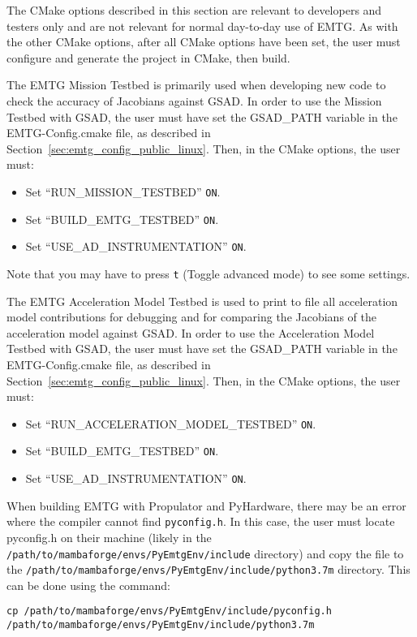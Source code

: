 
The CMake options described in this section are relevant to developers and testers only and are not relevant for normal day-to-day use of \ac{EMTG}. As with the other CMake options, after all CMake options have been set, the user must configure and generate the project in CMake, then build.

\noindent The \ac{EMTG} Mission Testbed is primarily used when developing new code to check the accuracy of Jacobians against \ac{GSAD}. In order to use the Mission Testbed with \ac{GSAD}, the user must have set the GSAD\_PATH variable in the EMTG-Config.cmake file, as described in Section~\ref{sec:emtg_config_public_linux}. Then, in the CMake options, the user must:

\begin{itemize}
	\item Set ``RUN\_MISSION\_TESTBED'' \texttt{ON}.
	\item Set ``BUILD\_EMTG\_TESTBED'' \texttt{ON}.
	\item Set ``USE\_AD\_INSTRUMENTATION'' \texttt{ON}.
\end{itemize}

\noindent Note that you may have to press \texttt{t} (Toggle advanced mode) to see some settings.

\noindent The \ac{EMTG} Acceleration Model Testbed is used to print to file all acceleration model contributions for debugging and for comparing the Jacobians of the acceleration model against \ac{GSAD}. In order to use the Acceleration Model Testbed with \ac{GSAD}, the user must have set the GSAD\_PATH variable in the EMTG-Config.cmake file, as described in Section~\ref{sec:emtg_config_public_linux}. Then, in the CMake options, the user must:

\begin{itemize}
	\item Set ``RUN\_ACCELERATION\_MODEL\_TESTBED'' \texttt{ON}.
	\item Set ``BUILD\_EMTG\_TESTBED'' \texttt{ON}.
	\item Set ``USE\_AD\_INSTRUMENTATION'' \texttt{ON}.
\end{itemize}

\noindent When building \ac{EMTG} with Propulator and PyHardware, there may be an error where the compiler cannot find \texttt{pyconfig.h}. In this case, the user must locate pyconfig.h on their machine (likely in the \texttt{/path/to/mambaforge/envs/PyEmtgEnv/include} directory) and copy the file to the \texttt{/path/to/mambaforge/envs/PyEmtgEnv/include/python3.7m} directory. This can be done using the command:

\texttt{cp /path/to/mambaforge/envs/PyEmtgEnv/include/pyconfig.h /path/to/mambaforge/\newline\indent envs/PyEmtgEnv/include/python3.7m}